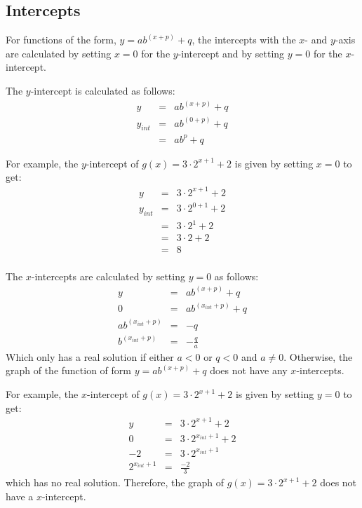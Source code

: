 
\subsection{Intercepts}
For functions of the form, $y=ab^{(x+p)} + q$, the intercepts with the $x$- and $y$-axis are calculated by setting $x=0$ for the $y$-intercept and by setting $y=0$ for the $x$-intercept.

The $y$-intercept is calculated as follows:
\begin{eqnarray}
y&=&ab^{(x+p)} + q\\
y_{int}&=&ab^{(0+p)} + q\\
&=&ab^p + q
\end{eqnarray}

For example, the $y$-intercept of $g(x)=3\cdot 2^{x+1} + 2$ is given by setting $x=0$ to get:
\begin{eqnarray*}
y&=&3\cdot 2^{x+1} + 2\\
y_{int}&=&3\cdot 2^{0+1} + 2\\
&=&3\cdot 2^{1} + 2\\
&=&3 \cdot 2 + 2\\
&=&8\\
\end{eqnarray*}

The $x$-intercepts are calculated by setting $y=0$ as follows:
\begin{eqnarray}
y&=&ab^{(x+p)} + q\\
0&=&ab^{(x_{int}+p)} + q\\
ab^{(x_{int}+p)}&=&-q\\
b^{(x_{int}+p)}&=&-\frac{q}{a}
\end{eqnarray}
Which only has a real solution if either $a<0$ or $q<0$ and $a\neq0$. Otherwise, the graph of the function of form $y=ab^{(x+p)} + q$ does not have any $x$-intercepts.

For example, the $x$-intercept of $g(x)=3\cdot 2^{x+1} + 2$ is given by setting $y=0$ to get:
\begin{eqnarray*}
y&=&3\cdot 2^{x+1} + 2\\
0&=&3\cdot 2^{x_{int}+1} + 2\\
-2&=&3\cdot 2^{x_{int}+1}\\
2^{x_{int}+1}&=&\frac{-2}{3}
\end{eqnarray*}
which has no real solution. Therefore, the graph of $g(x)=3\cdot 2^{x+1} + 2$ does not have a $x$-intercept.

